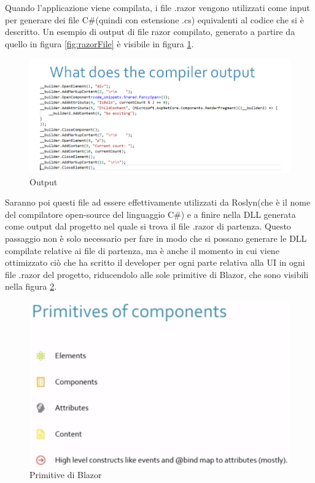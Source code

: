 Quando l'applicazione viene compilata, i file .razor vengono utilizzati come input per generare dei file C\#(quindi con estensione .cs) equivalenti al codice che si \`e descritto\cite{ryanNowakNDCSydney}.
Un esempio di output di file razor compilato, generato a partire da quello in figura \ref{fig:razorFile} \`e visibile in figura \ref{fig:compiledRazorFile}.
\begin{figure}[H]
	\centerline{\includegraphics[scale=0.55]{figure/RazorFileCompiled.PNG}}
	\caption{Output\cite{ryanNowakNDCSydney}}
	\label{fig:compiledRazorFile}
\end{figure}

Saranno poi questi file ad essere effettivamente utilizzati da Roslyn(che \`e il nome del compilatore open-source del linguaggio C\#) e a finire nella DLL generata come output dal progetto nel quale si trova il file .razor di partenza.
Questo passaggio non \`e solo necessario per fare in modo che si possano generare le DLL compilate relative ai file di partenza, ma \`e anche il momento in cui viene ottimizzato ci\`o che ha scritto il developer per ogni parte relativa alla UI in ogni file .razor del progetto, riducendolo alle sole primitive di Blazor, che sono visibili nella figura \ref{fig:BlazorPrimitives}.

\begin{figure}[H]
	\centerline{\includegraphics[scale=0.7]{figure/BlazorPrimitives.PNG}}
	\caption{Primitive di Blazor\cite{ryanNowakNDCSydney}}
	\label{fig:BlazorPrimitives}
\end{figure}

